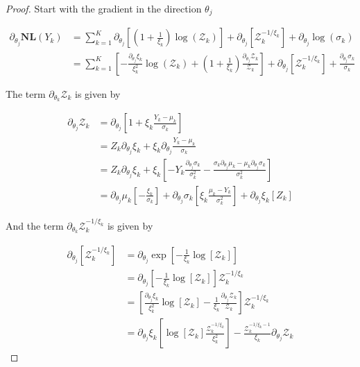 \documentclass[12pt,a4paper]{article}
\theoremstyle{plain}
\theoremstyle{definition}
\theoremstyle{remark}
\newcommand{\zZ}{\mathcal{Z}}
\newcommand{\NL}{\mathbf{NL}}
\begin{document}
\begin{proof} Start with the gradient in the direction $\theta_j$ %

\[
\begin{aligned}
\partial_{\theta_j}\NL(Y_k) & =\sum_{k=1}^K
\partial_{\theta_j}\left[\left(1+\frac{1}{\xi_k}\right)\log(\zZ_k)\right] + 
\partial_{\theta_j}\left[\zZ_k^{-1/\xi_k}\right] +
\partial_{\theta_j}\log(\sigma_k)\\
& =\sum_{k=1}^K
\left[-\frac{\partial_{\theta_j}\xi_k}{\xi_k^2}\log(\zZ_k) + 
\left(1+\frac{1}{\xi_k}\right)\frac{\partial_{\theta_j}\zZ_k}{\zZ_k}\right] +
\partial_{\theta_j}\left[\zZ_k^{-1/\xi_k}\right] + 
\frac{\partial_{\theta_j}\sigma_k}{\sigma_k}
\end{aligned}
\]

\noindent The term $\partial_{\theta_k}\zZ_k$ is given by

\[
\begin{aligned}
\partial_{\theta_j}\zZ_k & =\partial_{\theta_j}\left[1+\xi_k\frac{Y_k-\mu_k}{\sigma_k}\right]\\
 & =Z_k\partial_{\theta_j}\xi_k+\xi_k\partial_{\theta_j}\frac{Y_k-\mu_k}{\sigma_k}\\
 &
 =Z_k\partial_{\theta_j}\xi_k+\xi_k\left[-Y_k\frac{\partial_{\theta_j}\sigma_k}{\sigma_k^2}-\frac{\sigma_k\partial_{\theta_j}\mu_k-\mu_k\partial_{\theta_j}\sigma_k}{\sigma_k^2}\right]\\
 &
 =\partial_{\theta_j}\mu_k\left[-\frac{\xi_k}{\sigma_k}\right]+\partial_{\theta_j}\sigma_k\left[\xi_k\frac{\mu_k-Y_k}{\sigma_k^2}\right]+\partial_{\theta_j}\xi_k\left[Z_k\right]
\end{aligned}
\]

\noindent And the term $\partial_{\theta_k}\zZ_k^{-1/\xi_k}$ is given by

\[
\begin{aligned}
\partial_{\theta_j}\left[\zZ_k^{-1/\xi_k}\right]
&= \partial_{\theta_j}\exp\left[-\frac{1}{\xi_k}\log\left[\zZ_k\right]\right]\\
&= \partial_{\theta_j}\left[-\frac{1}{\xi_k}\log\left[\zZ_k\right]\right]\zZ_k^{-1/\xi_k}\\
&= \left[\frac{\partial_{\theta_j}\xi_k}{\xi_k^2}\log\left[\zZ_k\right] -
\frac{1}{\xi_k}\frac{\partial_{\theta_j}\zZ_k}{\zZ_k}\right]\zZ_k^{-1/\xi_k}\\
&=
\partial_{\theta_j}\xi_k\left[\log\left[\zZ_k\right]\frac{\zZ_{k}^{-1/\xi_k}}{\xi_k^2}\right] -
\frac{\zZ_k^{-1/\xi_k-1}}{\xi_k}\partial_{\theta_j}\zZ_k
\end{aligned}
\]


\end{proof}
\end{document}
